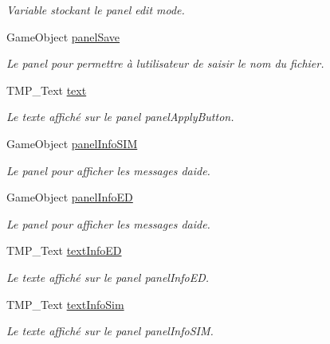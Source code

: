 \begin{DoxyCompactItemize}
\begin{DoxyCompactList}\small\item\em Variable stockant le panel edit mode. \end{DoxyCompactList}\item 
Game\+Object \mbox{\hyperlink{class_navigation_acea32f74d9820c1cd657a3e5371f1a58}{panel\+Save}}
\begin{DoxyCompactList}\small\item\em Le panel pour permettre à l\textquotesingle{}utilisateur de saisir le nom du fichier. \end{DoxyCompactList}\item 
T\+M\+P\+\_\+\+Text \mbox{\hyperlink{class_navigation_ac6f0605a263e970630f2946dbc8f5ca3}{text}}
\begin{DoxyCompactList}\small\item\em Le texte affiché sur le panel panel\+Apply\+Button. \end{DoxyCompactList}\item 
Game\+Object \mbox{\hyperlink{class_navigation_a12eac73989286c8368155f21bc6d5156}{panel\+Info\+S\+IM}}
\begin{DoxyCompactList}\small\item\em Le panel pour afficher les messages d\textquotesingle{}aide. \end{DoxyCompactList}\item 
Game\+Object \mbox{\hyperlink{class_navigation_addc473bc967fa8543b016df5b5411b3e}{panel\+Info\+ED}}
\begin{DoxyCompactList}\small\item\em Le panel pour afficher les messages d\textquotesingle{}aide. \end{DoxyCompactList}\item 
T\+M\+P\+\_\+\+Text \mbox{\hyperlink{class_navigation_af2ad653f49a97486583aa60103af3e6d}{text\+Info\+ED}}
\begin{DoxyCompactList}\small\item\em Le texte affiché sur le panel panel\+Info\+ED. \end{DoxyCompactList}\item 
T\+M\+P\+\_\+\+Text \mbox{\hyperlink{class_navigation_aefa9a0108a63c721559a2ede11fad997}{text\+Info\+Sim}}
\begin{DoxyCompactList}\small\item\em Le texte affiché sur le panel panel\+Info\+S\+IM. \end{DoxyCompactList}\end{DoxyCompactItemize}


